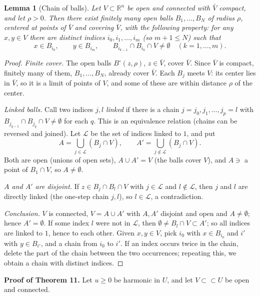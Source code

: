 \documentclass[11pt]{article}
\theoremstyle{plain}
\newtheorem{lemma}[theorem]{Lemma}
\theoremstyle{definition}
\theoremstyle{remark}
\begin{document}
\begin{lemma}[Chain of balls]\label{lem:chain}
Let $V \subset \mathbb{R}^n$ be open and connected with $\bar V$ compact, and let $\rho > 0$. Then there exist finitely many open balls $B_1, \dots, B_N$ of radius $\rho$, centered at points of $\bar V$ and covering $\bar V$, with the following property: for any $x, y \in V$ there are distinct indices $i_0, i_1, \dots, i_m$ (so $m + 1 \leq N$) such that
$$ x \in B_{i_0}, \qquad y \in B_{i_m}, \qquad B_{i_{k-1}} \cap B_{i_k} \cap V \neq \emptyset \quad (k = 1, \dots, m). $$
\end{lemma}
\begin{proof}
\emph{Finite cover.} The open balls $B^\circ(z,\rho)$, $z \in \bar V$, cover $\bar V$. Since $\bar V$ is compact, finitely many of them, $B_1, \dots, B_N$, already cover $\bar V$. Each $B_j$ meets $V$: its center lies in $\bar V$, so it is a limit of points of $V$, and some of these are within distance $\rho$ of the center.

\emph{Linked balls.} Call two indices $j, l$ \emph{linked} if there is a chain $j = j_0, j_1, \dots, j_p = l$ with $B_{j_{q-1}}\cap B_{j_q}\cap V \neq \emptyset$ for each $q$. This is an equivalence relation (chains can be reversed and joined). Let $\mathcal{L}$ be the set of indices linked to $1$, and put
$$ A = \bigcup_{j \in \mathcal{L}} (B_j \cap V), \qquad A' = \bigcup_{j \notin \mathcal{L}} (B_j \cap V). $$
Both are open (unions of open sets), $A \cup A' = V$ (the balls cover $V$), and $A \ni$ a point of $B_1 \cap V$, so $A \neq \emptyset$.

\emph{$A$ and $A'$ are disjoint.} If $z \in B_j \cap B_l \cap V$ with $j \in \mathcal{L}$ and $l \notin \mathcal{L}$, then $j$ and $l$ are directly linked (the one-step chain $j, l$), so $l \in \mathcal{L}$, a contradiction.

\emph{Conclusion.} $V$ is connected, $V = A \cup A'$ with $A, A'$ disjoint and open and $A \neq \emptyset$; hence $A' = \emptyset$. If some index $l$ were not in $\mathcal{L}$, then $\emptyset \neq B_l \cap V \subset A'$; so all indices are linked to $1$, hence to each other. Given $x, y \in V$, pick $i_0$ with $x \in B_{i_0}$ and $i'$ with $y \in B_{i'}$, and a chain from $i_0$ to $i'$. If an index occurs twice in the chain, delete the part of the chain between the two occurrences; repeating this, we obtain a chain with distinct indices.
\end{proof}

\textbf{Proof of Theorem 11.} Let $u \geq 0$ be harmonic in $U$, and let $V \subset\subset U$ be open and connected.
\end{document}
